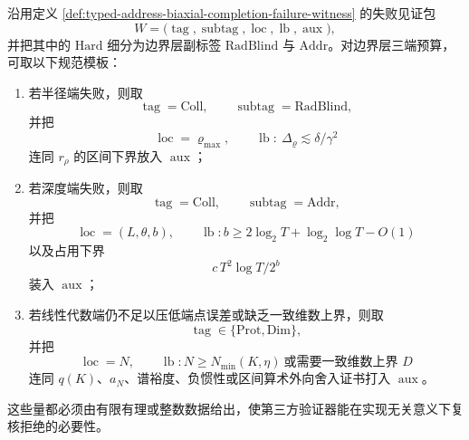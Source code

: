 \begin{definition}[失败见证的边界层模板]\label{def:typed-address-biaxial-completion-boundary-witness-template}
沿用定义 \ref{def:typed-address-biaxial-completion-failure-witness} 的失败见证包
\[
W=
\bigl(
\operatorname{tag},
\operatorname{subtag},
\operatorname{loc},
\operatorname{lb},
\operatorname{aux}
\bigr),
\]
并把其中的 \(\mathrm{Hard}\) 细分为边界层副标签 \(\mathrm{RadBlind}\) 与 \(\mathrm{Addr}\)。对边界层三端预算，可取以下规范模板：
\begin{enumerate}
  \item 若半径端失败，则取
  \[
  \operatorname{tag}=\mathrm{Coll},
  \qquad
  \operatorname{subtag}=\mathrm{RadBlind},
  \]
  并把
  \[
  \operatorname{loc}=\varrho_{\max},
  \qquad
  \operatorname{lb}:\ \Delta_{\varrho}\lesssim \delta/\gamma^2
  \]
  连同 \(r_{\rho}\) 的区间下界放入 \(\operatorname{aux}\)；
  \item 若深度端失败，则取
  \[
  \operatorname{tag}=\mathrm{Coll},
  \qquad
  \operatorname{subtag}=\mathrm{Addr},
  \]
  并把
  \[
  \operatorname{loc}=(L,\theta,b),
  \qquad
  \operatorname{lb}: b\ge 2\log_2 T+\log_2\log T-O(1)
  \]
  以及占用下界
  \[
  c\,T^2\log T/2^b
  \]
  装入 \(\operatorname{aux}\)；
  \item 若线性代数端仍不足以压低端点误差或缺乏一致维数上界，则取
  \[
  \operatorname{tag}\in\{\mathrm{Prot},\mathrm{Dim}\},
  \]
  并把
  \[
  \operatorname{loc}=N,
  \qquad
  \operatorname{lb}: N\ge N_{\min}(K,\eta)\ \text{或需要一致维数上界 }D
  \]
  连同 \(q(K)\)、\(a_N\)、谱裕度、负惯性或区间算术外向舍入证书打入 \(\operatorname{aux}\)。
\end{enumerate}
这些量都必须由有限有理或整数数据给出，使第三方验证器能在实现无关意义下复核拒绝的必要性。
\end{definition}


